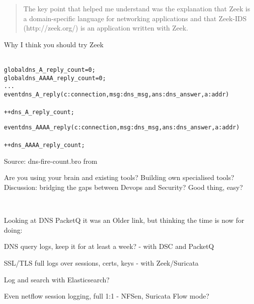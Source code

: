 \documentclass[20pt,landscape,a4paper,footrule]{foils}
\begin{document}

\begin{quote}
	The key point that helped me understand was the explanation that Zeek is a
               domain-specific language for networking applications and that Zeek-IDS
               (http://zeek.org/) is an application written with Zeek.
\end{quote}

Why I think you should try Zeek\\
\\


\begin{alltt}\small
global dns_A_reply_count=0;
global dns_AAAA_reply_count=0;
...
event dns_A_reply(c: connection, msg: dns_msg, ans: dns_answer, a: addr)
	{
	++dns_A_reply_count;
	}

event dns_AAAA_reply(c: connection, msg: dns_msg, ans: dns_answer, a: addr)
	{
	++dns_AAAA_reply_count;
	}
\end{alltt}

Source: dns-fire-count.bro from\\
{\small {}}



Are you using your brain and existing tools? Building own specialised tools?\\
Discussion: bridging the gaps between Devops and Security? Good thing, easy?

{\footnotesize
{}\\
}



Looking at DNS PacketQ it was an Older link, but thinking the time is now for doing:

\begin{list2}
\item DNS query logs, keep it for at least a week? - with DSC and PacketQ
\item SSL/TLS full logs over sessions, certs, keys - with Zeek/Suricata\\
\item Log and search with Elasticsearch?\\
\item Even netflow session logging, full 1:1 - NFSen, Suricata Flow mode?
\end{list2}
\end{document}
